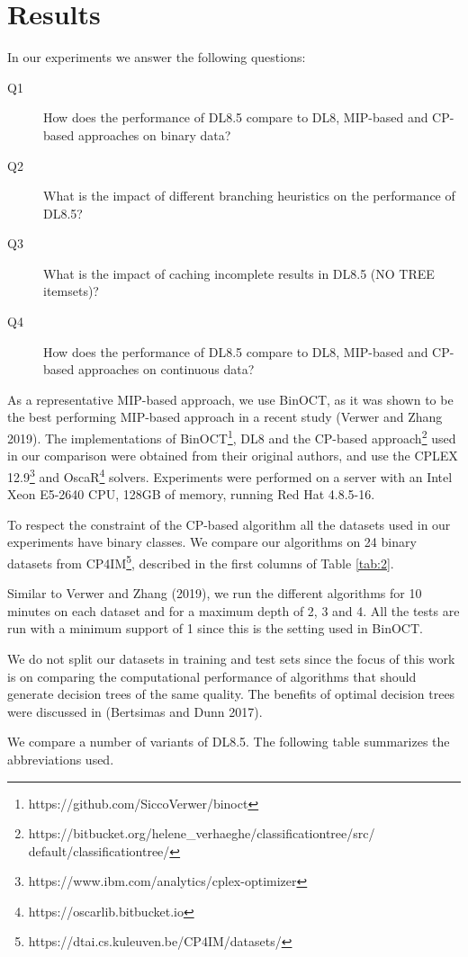 \section{Results}
In our experiments we answer the following questions:
\begin{description}
	\item[Q1] How does the performance of DL8.5 compare to DL8, MIP-based and CP-based approaches on binary data?
	\item[Q2] What is the impact of different branching heuristics on the performance of DL8.5?
	\item[Q3] What is the impact of caching incomplete results in DL8.5 (NO TREE itemsets)?
	\item[Q4] How does the performance of DL8.5 compare to DL8, MIP-based and CP-based approaches on continuous data?
\end{description}
As a representative MIP-based approach, we use BinOCT, as it was shown to be the best performing MIP-based approach in a recent study (Verwer and Zhang 2019). The implementations of BinOCT\footnote{https://github.com/SiccoVerwer/binoct}, DL8 and the CP-based approach\footnote{https://bitbucket.org/helene\_verhaeghe/classificationtree/src/ default/classificationtree/} used in our comparison were obtained from their original authors, and use the CPLEX 12.9\footnote{https://www.ibm.com/analytics/cplex-optimizer} and OscaR\footnote{https://oscarlib.bitbucket.io} solvers. Experiments were performed on a server with an Intel Xeon E5-2640 CPU, 128GB of memory, running Red Hat 4.8.5-16.

To respect the constraint of the CP-based algorithm all the datasets used in our experiments have binary classes. We compare our algorithms on 24 binary datasets from CP4IM\footnote{https://dtai.cs.kuleuven.be/CP4IM/datasets/}, described in the first columns of Table \ref{tab:2}.

Similar to Verwer and Zhang (2019), we run the different algorithms for 10 minutes on each dataset and for a maximum depth of 2, 3 and 4. All the tests are run with a minimum support of 1 since this is the setting used in BinOCT.

We do not split our datasets in training and test sets since the focus of this work is on comparing the computational performance of algorithms that should generate decision trees of the same quality. The benefits of optimal decision trees were discussed in (Bertsimas and Dunn 2017).

We compare a number of variants of DL8.5. The following table summarizes the abbreviations used.

